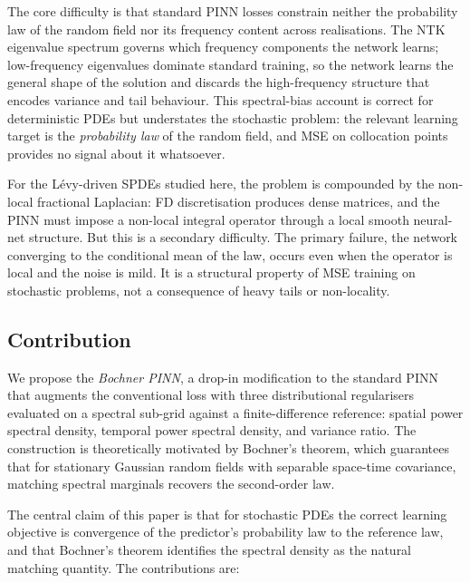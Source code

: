 \documentclass[review,12pt]{elsarticle}
\begin{document}
The core difficulty is that standard PINN losses constrain neither the
probability law of the random field nor its frequency content across
realisations. The NTK eigenvalue spectrum governs which frequency
components the network learns; low-frequency eigenvalues dominate
standard training, so the network learns the general shape of the
solution and discards the high-frequency structure that encodes
variance and tail behaviour. This spectral-bias account is correct for
deterministic PDEs but understates the stochastic problem: the
relevant learning target is the \emph{probability law} of the random
field, and MSE on collocation points provides no signal about it
whatsoever.

For the Lévy-driven SPDEs studied here, the problem is compounded by
the non-local fractional Laplacian: FD discretisation produces dense
matrices, and the PINN must impose a non-local integral operator
through a local smooth neural-net structure. But this is a secondary
difficulty. The primary failure, the network converging to the
conditional mean of the law, occurs even when the operator is local
and the noise is mild. It is a structural property of MSE training on
stochastic problems, not a consequence of heavy tails or non-locality.

\subsection{Contribution}
\label{subsec:contribution}

We propose the \emph{Bochner PINN}, a drop-in modification to the
standard PINN that augments the conventional loss with three
distributional regularisers evaluated on a spectral sub-grid against a
finite-difference reference: spatial power spectral density, temporal
power spectral density, and variance ratio. The construction is
theoretically motivated by Bochner's theorem, which guarantees that
for stationary Gaussian random fields with separable space-time
covariance, matching spectral marginals recovers the second-order law.

The central claim of this paper is that for stochastic PDEs the
correct learning objective is convergence of the predictor's
probability law to the reference law, and that Bochner's theorem
identifies the spectral density as the natural matching quantity.
The contributions are:
\end{document}
